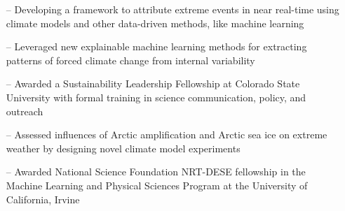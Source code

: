 \documentclass[10pt,a4paper]{altacv}
\begin{document}

\begin{itemize}
    \setlength{\itemindent}{0.5em}
    \item[--]   \small{Developing a framework to attribute extreme events in near real-time using climate models and other data-driven methods, like machine learning}
\end{itemize}
\medskip

\begin{itemize}
    \setlength{\itemindent}{0.5em}
    \item[--]   \small{Leveraged new explainable machine learning methods for extracting patterns of forced climate change from internal variability}
    \item[--]    \small{Awarded a Sustainability Leadership Fellowship at Colorado State University with formal training in science communication, policy, and outreach}
\end{itemize}
\medskip

\begin{itemize}
    \setlength{\itemindent}{0.5em}
    \item[--]   \small{Assessed influences of Arctic amplification and Arctic sea ice on extreme weather by designing novel climate model experiments}
    \item[--]    \small{Awarded National Science Foundation NRT-DESE fellowship in the Machine Learning and Physical Sciences Program at the University of California, Irvine}
\end{itemize}

\medskip


\hspace*{-1.1cm} 


\end{document}
